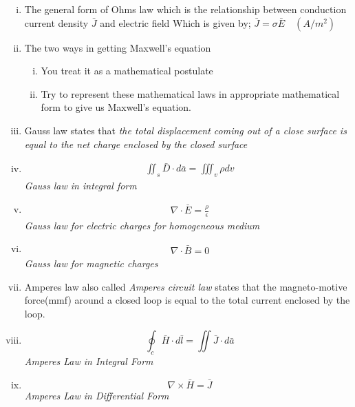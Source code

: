 \begin{mdframed}[backgroundcolor=lightblue, linewidth=1pt, hidealllines=true]
\begin{enumerate}[(i)]
\item The general form of Ohms law which is the relationship between conduction current density $\bar{J}$ and electric field Which is given by; $\boxed{\bar{J} = \sigma\bar{E}}\quad (A/m^{2})$

\item The two ways in getting Maxwell's equation
\begin{enumerate}[(i)]
\item	You treat it as a mathematical postulate
\item	Try to represent these mathematical laws in appropriate mathematical form to give us Maxwell's equation.
\end{enumerate}

\item Gauss law states that \emph{the total displacement coming out of a close surface is equal to the net charge enclosed by the closed surface}

\item \begin{align*}
\iint_s\bar{D}\cdot{d\bar{a}} = \iiint_v\rho dv
\end{align*}
\emph{Gauss law in integral form}

\item \begin{align*} 
\nabla \cdot \bar{E} = \frac{\rho}{\epsilon}
\end{align*} 
\emph{Gauss law for electric charges for homogeneous medium}

\item \begin{align*}
\nabla \cdot \bar{B} = 0
\end{align*}
\emph{Gauss law for magnetic charges}

\item Amperes law also called \emph{Amperes circuit law} states that the magneto-motive force(mmf) around a closed loop is equal to the total current enclosed by the loop.

\item \begin{equation*}
\oint_c\bar{H} \cdot d\bar{l} = \iint\bar{J} \cdot d\bar{a}
\end{equation*}
\emph{Amperes Law in Integral Form}

\item \begin{equation*}
\boxed{\nabla \times \bar{H} = \bar{J}}
\end{equation*}
\emph{Amperes Law in Differential Form}


\end{enumerate}
\end{mdframed}
